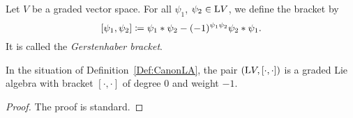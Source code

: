 \documentclass[\MainFolder/Text.tex]{subfiles}
\begin{document}
\begin{Definition}\label{Def:CanonLA}
Let $V$ be a graded vector space. For all $\psi_1$, $\psi_2 \in \mathrm{L} V$, we define the bracket by
\[ [\psi_1, \psi_2] \coloneqq \psi_1 * \psi_2 - (-1)^{\psi_1 \psi_2} \psi_2 * \psi_1. \]
It is called the \emph{Gerstenhaber bracket}.
\end{Definition}
\begin{Proposition}\label{Prop:CanonLA}
In the situation of Definition~\ref{Def:CanonLA}, the pair $(\mathrm{L} V,[\cdot,\cdot])$ is a graded Lie algebra with bracket $[\cdot,\cdot]$ of degree $0$ and weight $-1$.
\end{Proposition}
\begin{proof}
The proof is standard.
\end{proof}
\end{document}
